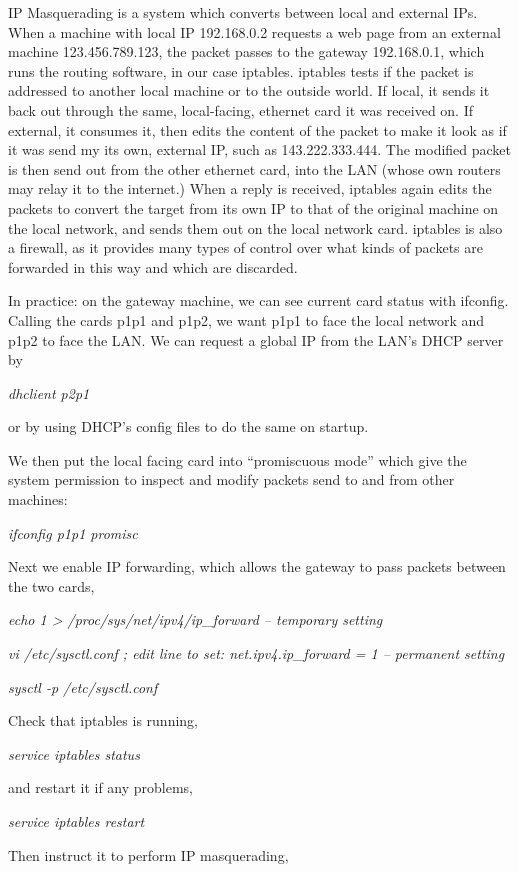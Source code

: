 \documentclass[oneside,english]{scrbook}
\begin{document}
IP Masquerading is a system which converts between local and external
IPs. When a machine with local IP 192.168.0.2 requests a web page
from an external machine 123.456.789.123, the packet passes to the
gateway 192.168.0.1, which runs the routing software, in our case
iptables. iptables tests if the packet is addressed to another local
machine or to the outside world. If local, it sends it back out through
the same, local-facing, ethernet card it was received on. If external,
it consumes it, then edits the content of the packet to make it look
as if it was send my its own, external IP, such as 143.222.333.444.
The modified packet is then send out from the other ethernet card,
into the LAN (whose own routers may relay it to the internet.) When
a reply is received, iptables again edits the packets to convert the
target from its own IP to that of the original machine on the local
network, and sends them out on the local network card. iptables is
also a firewall, as it provides many types of control over what kinds
of packets are forwarded in this way and which are discarded.

In practice: on the gateway machine, we can see current card status
with ifconfig. Calling the cards p1p1 and p1p2, we want p1p1 to face
the local network and p1p2 to face the LAN. We can request a global
IP from the LAN's DHCP server by 

\emph{dhclient p2p1}

or by using DHCP's config files to do the same on startup.

We then put the local facing card into ``promiscuous mode'' which
give the system permission to inspect and modify packets send to and
from other machines:

\emph{ifconfig p1p1 promisc}

Next we enable IP forwarding, which allows the gateway to pass packets
between the two cards,

\emph{echo 1 > /proc/sys/net/ipv4/ip\_forward -- temporary setting}

\emph{vi /etc/sysctl.conf ; edit line to set: net.ipv4.ip\_forward
= 1 -- permanent setting}

\emph{sysctl -p /etc/sysctl.conf}

Check that iptables is running,

\emph{service iptables status}

and restart it if any problems,

\emph{service iptables restart}

Then instruct it to perform IP masquerading,
\end{document}
